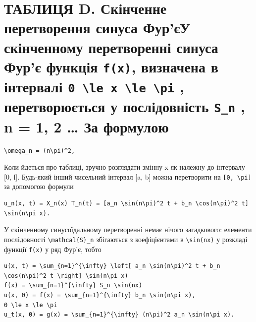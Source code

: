 \documentclass[
  ukrainian,
]{article}
\begin{document}
\section{\texorpdfstring{ТАБЛИЦЯ D. Скінченне перетворення синуса Фур'єУ
скінченному перетворенні синуса Фур'є функція \texttt{f(x)}, визначена в
інтервалі
\texttt{0\ \textbackslash{}le\ x\ \textbackslash{}le\ \textbackslash{}pi}
, перетворюється у послідовність \texttt{S\_n} , n = 1, 2 \ldots{} За
формулою}{ТАБЛИЦЯ D. Скінченне перетворення синуса Фур'єУ скінченному перетворенні синуса Фур'є функція f(x), визначена в інтервалі 0 \textbackslash le x \textbackslash le \textbackslash pi , перетворюється у послідовність S\_n , n = 1, 2 \ldots{} За формулою}}\label{ux442ux430ux431ux43bux438ux446ux44f-d.-ux441ux43aux456ux43dux447ux435ux43dux43dux435-ux43fux435ux440ux435ux442ux432ux43eux440ux435ux43dux43dux44f-ux441ux438ux43dux443ux441ux430-ux444ux443ux440ux454ux443-ux441ux43aux456ux43dux447ux435ux43dux43dux43eux43cux443-ux43fux435ux440ux435ux442ux432ux43eux440ux435ux43dux43dux456-ux441ux438ux43dux443ux441ux430-ux444ux443ux440ux454-ux444ux443ux43dux43aux446ux456ux44f-fx-ux432ux438ux437ux43dux430ux447ux435ux43dux430-ux432-ux456ux43dux442ux435ux440ux432ux430ux43bux456-0-le-x-le-pi-ux43fux435ux440ux435ux442ux432ux43eux440ux44eux454ux442ux44cux441ux44f-ux443-ux43fux43eux441ux43bux456ux434ux43eux432ux43dux456ux441ux442ux44c-s_n-n-1-2-ux437ux430-ux444ux43eux440ux43cux443ux43bux43eux44e}

\begin{verbatim}
\omega_n = (n\pi)^2,
\end{verbatim}

Коли йдеться про таблиці, зручно розглядати змінну x як належну до
інтервалу {[}0, l{]}. Будь-який інший чисельний інтервал {[}a, b{]}
можна перетворити на \texttt{{[}0,\ \textbackslash{}pi{]}} за допомогою
формули

\begin{verbatim}
u_n(x, t) = X_n(x) T_n(t) = [a_n \sin(n\pi)^2 t + b_n \cos(n\pi)^2 t] \sin(n\pi x).
\end{verbatim}

У скінченному синусоїдальному перетворенні немає нічого загадкового:
елементи послідовності \texttt{\textbackslash{}mathcal\{S\}\_n}
збігаються з коефіцієнтами в \texttt{\textbackslash{}sin(nx)} у розкладі
функції \texttt{f(x)} у ряд Фур'є, тобто

\begin{verbatim}
u(x, t) = \sum_{n=1}^{\infty} \left[ a_n \sin(n\pi)^2 t + b_n \cos(n\pi)^2 t \right] \sin(n\pi x)
f(x) = \sum_{n=1}^{\infty} S_n \sin(nx)
u(x, 0) = f(x) = \sum_{n=1}^{\infty} b_n \sin(n\pi x),
0 \le x \le \pi
u_t(x, 0) = g(x) = \sum_{n=1}^{\infty} (n\pi)^2 a_n \sin(n\pi x).
\end{verbatim}
\end{document}
